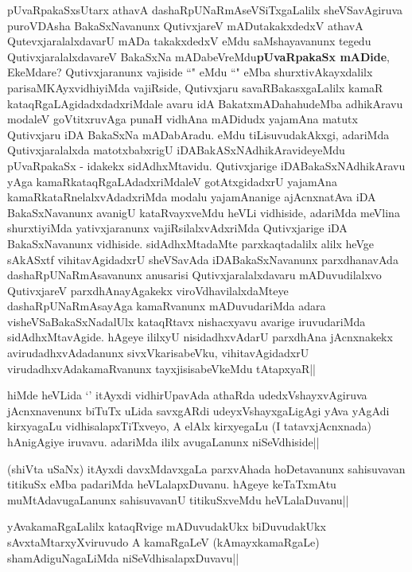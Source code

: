 \begin{artha}
pUvaRpakaSxsUtarx athavA dashaRpUNaRmAseVSiTxgaLalilx sheVSavAgiruva puroVDAsha BakaSxNavanunx QutivxjareV mADutakakxdedxV athavA QutevxjaralalxdavarU mADa takakxdedxV eMdu saMshayavanunx tegedu QutivxjaralalxdavareV BakaSxNa mADabeVreMdu\textbf{pUvaRpakaSx mADide}, EkeMdare? Qutivxjaranunx vajiside ``\stext" eMdu ``\stext" eMba shurxtivAkayxdalilx parisaMKAyxvidhiyiMda vajiRside, Qutivxjaru savaRBakasxgaLalilx kamaR kataqRgaLAgidadxdadxriMdale avaru idA BakatxmADahahudeMba adhikAravu modaleV goVtitxruvAga punaH vidhAna mADidudx yajamAna matutx Qutivxjaru iDA BakaSxNa mADabAradu.
eMdu tiLisuvudakAkxgi, adariMda Qutivxjaralalxda matotxbabxrigU iDABakASxNAdhikAravideyeMdu pUvaRpakaSx - idakekx sidAdhxMtavidu. Qutivxjarige iDABakaSxNAdhikAravu yAga kamaRkataqRgaLAdadxriMdaleV gotAtxgidadxrU yajamAna kamaRkataRnelalxvAdadxriMda modalu yajamAnanige ajAcnxnatAva iDA BakaSxNavanunx avanigU kataRvayxveMdu heVLi vidhiside, adariMda meVlina shurxtiyiMda yativxjaranunx vajiRsilalxvAdxriMda Qutivxjarige iDA BakaSxNavanunx vidhiside. sidAdhxMtadaMte parxkaqtadalilx alilx heVge sAkASxtf vihitavAgidadxrU sheVSavAda iDABakaSxNavanunx parxdhanavAda dashaRpUNaRmAsavanunx anusarisi Qutivxjaralalxdavaru mADuvudilalxvo QutivxjareV parxdhAnayAgakekx viroVdhavilalxdaMteye dashaRpUNaRmAsayAga kamaRvanunx mADuvudariMda adara visheVSaBakaSxNadalUlx kataqRtavx nishacxyavu avarige iruvudariMda sidAdhxMtavAgide. hAgeye ililxyU nisidadhxvAdarU parxdhAna jAcnxnakekx avirudadhxvAdadanunx sivxVkarisabeVku, vihitavAgidadxrU virudadhxvAdakamaRvanunx tayxjisisabeVkeMdu tAtapxyaR||
\end{artha}

\begin{artha}
hiMde heVLida `\stext'  itAyxdi vidhirUpavAda athaRda udedxVshayxvAgiruva jAcnxnavenunx biTuTx uLida savxgARdi udeyxVshayxgaLigAgi yAva yAgAdi kirxyagaLu vidhisalapxTiTxveyo, A elAlx kirxyegaLu (I tatavxjAcnxnada) hAnigAgiye iruvavu. adariMda ililx avugaLanunx niSeVdhiside||
\end{artha}


\begin{artha}
(shiVta uSaNx) itAyxdi davxMdavxgaLa parxvAhada hoDetavanunx sahisuvavan titikuSx eMba padariMda heVLalapxDuvanu. hAgeye keTaTxmAtu muMtAdavugaLanunx sahisuvavanU titikuSxveMdu heVLalaDuvanu||
\end{artha}

\begin{artha}
yAvakamaRgaLalilx kataqRvige mADuvudakUkx biDuvudakUkx sAvxtaMtarxyXviruvudo A kamaRgaLeV (kAmayxkamaRgaLe) shamAdiguNagaLiMda niSeVdhisalapxDuvavu||
\end{artha}

